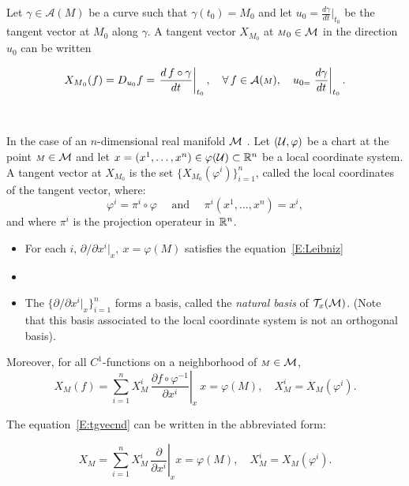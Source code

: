 Let $\gamma\in\mathcal{A}({\scriptstyle M})$ be a curve such that $\gamma(t_0)={\scriptstyle M}_0$ and let $u_{0}=\frac{d\gamma}{dt} \vert_{t_{0}}$ be the tangent vector at ${\scriptstyle M}_0$ along $\gamma$. 
A tangent vector $X_{{\scriptstyle M}_0}$ at ${\scriptstyle M}_0\in \mathcal{M}$  in the direction $u_{0}$ can be written

\begin{equation}\label{E:tdveccov}
X_{{\scriptstyle M}_0}(f)= D_{u_{0}}f=\left.\frac{d\,f\circ \gamma}{dt}\right|_{t_0},  \quad \forall \,f\in \mathcal{A}({\scriptstyle M}),\quad u_{0=}\left.\frac{d\gamma}{dt}\right|_{t_{0}}.
\end{equation}

\,

 In the case of an $n$-dimensional real manifold $\mathcal{M}$ . Let $(\mathcal{U},\varphi)$ be a chart at the point ${\scriptstyle M}\in \mathcal{M}$ and let  $x=(x^1,\dots,x^n) \in \varphi(\mathcal{U})\subset \mathbb{R}^n$ be a local coordinate system. A tangent vector at $X_{{\scriptstyle M}_0}$ is the set $\{ X_{{\scriptstyle M}_0}(\varphi^{i}) \}_{i=1}^{n}$, called the local coordinates of the tangent vector, where:
 \[ 
 \varphi^i= \pi^i\circ \varphi \quad \text{ and } \quad \pi^i(x^1,\dots,x^n)=x^i ,
  \] 
and where $\pi^i$ is the projection operateur in $\mathbb{R}^{n}$. 
  \begin{itemize}
\item For each $i, \, \partial/\partial x^i|_x ,\ x=\varphi({\scriptstyle M})$ satisfies the equation~\eqref{E:Leibniz}

\item[]
\item The
$\{\partial/\partial x^i|_x\}_{i=1}^n$ forms a basis, called the \emph{natural basis}  of $\mathcal{T}_x( \mathcal{M})$. (Note that this  basis associated to the local coordinate system is not an  orthogonal basis).
\end{itemize}

Moreover, for all $C^1$-functions  on a neighborhood of ${\scriptstyle M}\in \mathcal{M}$,
\begin{equation}\label{E:tgvecnd}
X_{\scriptstyle M}(f) =\left. \sum_{i=1}^n X^i_{\scriptstyle M}\,\frac{\partial f\circ \varphi^{-1}}{\partial x^i}\right\vert_x \ x={\varphi({\scriptstyle M})},\quad X^i_{\scriptstyle M}= X_{\scriptstyle M}(\varphi^i) .
 \end{equation}

The equation~\eqref{E:tgvecnd} can be written in the abbreviated form:

\begin{equation}\label{E:tgvecnd2}
 X_{\scriptstyle M}= \left. \sum_{i=1}^n X_{\scriptstyle M}^i\,\frac{\partial}{\partial x^i}\right|_x  x={\varphi({\scriptstyle M})},\quad X^i_{\scriptstyle M}= X_{\scriptstyle M}(\varphi^i).
 \end{equation}
 
